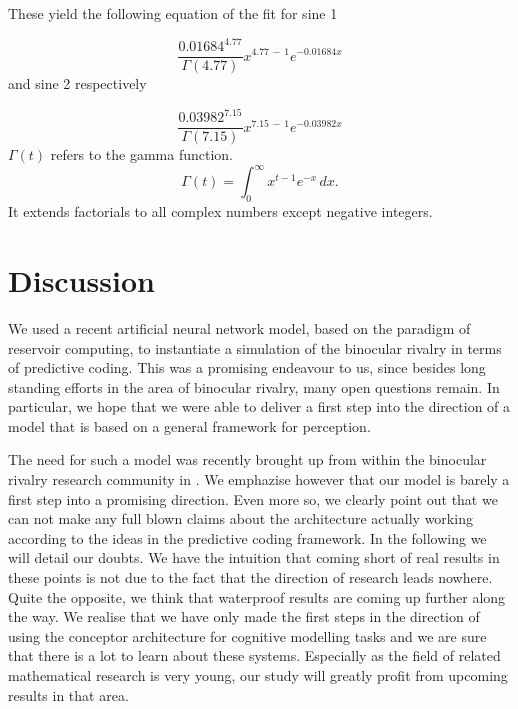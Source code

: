 \documentclass[utf8]{frontiersSCNS} %
\begin{document}
    \vspace{1cm}
    These yield the following equation of the fit for sine 1
     
     \begin{equation}
		{\frac {0.01684 ^{4.77}}{\Gamma (4.77)}}x^{4.77 \,-\,1}e^{-0.01684 x}
     \end{equation}
     and sine 2 respectively
     
     \begin{equation}
		{\frac {0.03982 ^{7.15}}{\Gamma (7.15)}}x^{7.15 \,-\,1}e^{-0.03982 x}     
     \end{equation}
     $\Gamma (t)$ refers to the gamma function.
     \begin{equation}
      \Gamma (t)=\int _{0}^{\infty }x^{t-1}e^{-x}\,dx.
     \end{equation}
     It extends factorials to all complex numbers except negative integers.

\section{Discussion}

    We used a recent artificial neural network model, based on the paradigm of reservoir computing, to instantiate a simulation of the binocular rivalry in terms of predictive coding. This was a promising endeavour to us, since besides long standing efforts in the area of binocular rivalry, many open questions remain. In particular, we hope that we were able to deliver a first step into the direction of a model that is based on a general framework for perception.
    
    The need for such a model was recently brought up from within the binocular rivalry research community in \cite{Hohwy2008}. We emphazise however that our model is barely a first step into a promising direction. Even more so, we clearly point out that we can not make any full blown claims about the architecture actually working according to the ideas in the predictive coding framework. In the following we will detail our doubts. 
    We have the intuition that coming short of real results in these points is not due to the fact that the direction of research leads nowhere. Quite the opposite, we think that waterproof results are coming up further along the way. We realise that we have only made the first steps in the direction of using the conceptor architecture for cognitive modelling tasks and we are sure that there is a lot to learn about these systems. Especially as the field of related mathematical research is very young, our study will greatly profit from upcoming results in that area.
  
\end{document}
